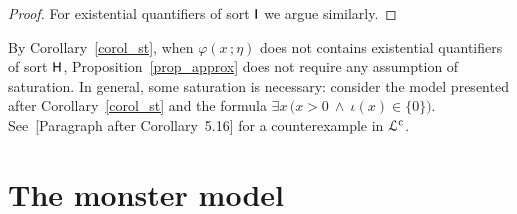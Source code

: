 \documentclass{amsproc}
\begin{document}
\begin{proof}
For existential quantifiers of sort ${\sf I}$ we argue similarly.%
%
%
%
%
%
\end{proof}


\def\ceq#1#2#3{\parbox[t]{20ex}{$\displaystyle #1$}\parbox[t]{6ex}{\hfil $#2$}{$\displaystyle #3$}}

\begin{remark}\label{remk_approx_EH_free}
  By Corollary~\ref{corol_st}, when $\varphi(x\,;\eta)$ does not contains existential quantifiers of sort ${\sf H}$, Proposition~\ref{prop_approx} does not require any assumption of saturation.
  In general, some saturation is necessary: consider the model presented after Corollary~\ref{corol_st} and the formula $\exists x\,\big(x>0\ \wedge\ \iota(x)\in\{0\}\big)$.
  See~[Paragraph after Corollary~5.16]\cite{HI} for a counterexample in ${\EuScript L}^{\rm c}$.
\end{remark}

  
\section{The monster model}\label{monster}
\end{document}
